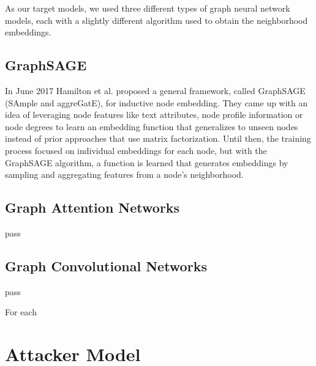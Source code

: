    As our target models, we used three different types of graph neural network models, each with a slightly different algorithm used to obtain the neighborhood embeddings.

    \subsection*{GraphSAGE}
      In June 2017 Hamilton et al.\cite{hamilton2018inductive} proposed a general framework, called GraphSAGE (SAmple and aggreGatE), for inductive node embedding. 
      They came up with an idea of leveraging node features like text attributes, node profile information or node degrees to learn an embedding function that generalizes to unseen nodes instead of prior approaches that use matrix factorization.
      Until then, the training process focused on individual embeddings for each node, but with the GraphSAGE algorithm, a function is learned that generates embeddings by sampling and aggregating features from a node's neighborhood.

    \subsection*{Graph Attention Networks}
      pass

    \subsection*{Graph Convolutional Networks}
      pass

    For each   


  \section{Attacker Model}
